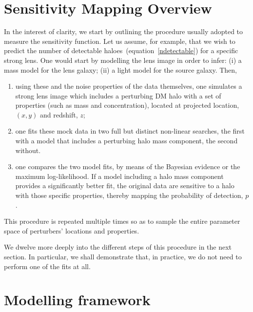 \documentclass[a4paper, fleqn, usenatbib, useAMS]{mnras}
\begin{document}
\section{Sensitivity Mapping Overview}
In the interest of clarity, we start by outlining the procedure usually adopted to measure the sensitivity function. 
Let us assume, for example, that we wish to predict the number of
detectable haloes~(equation~\ref{ndetectable}) for a specific strong
lens. One would start by  modelling the lens image in order to infer: (i) a mass model for the lens galaxy; (ii) a light model for the source galaxy. Then,

\begin{enumerate}[label=\arabic*)]
\item{using these and the noise properties of the data themselves, one
    {simulates a strong lens image which includes}  
a perturbing DM halo with a set of properties (such as mass
and concentration), located at projected location, $(x,y)$
and redshift, $z$;}
\item{one  fits these mock data in two full but distinct non-linear
    searches, the first with a model that includes a perturbing halo mass component, the second  without.} 
\item{one compares the two model fits, by means of the
    Bayesian evidence or the maximum log-likelihood. If a model
    including a halo mass component provides a significantly better
    fit, the original data are sensitive to a halo with those specific
    properties, thereby mapping the probability of detection, $p$.}
\end{enumerate}

\noindent This procedure is repeated multiple times so as to sample the entire parameter space of perturbers' locations and properties. 

We dwelve more deeply into the different steps of this procedure in
the next section. In particular, we shall demonstrate that, in
practice, we do not need to perform one of the fits at all.

\section{Modelling framework}
\end{document}
